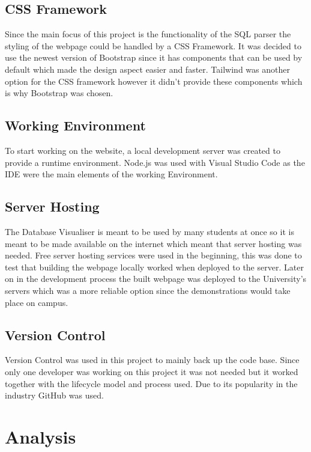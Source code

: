 \subsection{CSS Framework}

Since the main focus of this project is the functionality of the SQL parser the styling of the webpage could be handled by a CSS Framework. It was decided to use the newest version of Bootstrap \cite{Bootstrap} since it has components that can be used by default which made the design aspect easier and faster. Tailwind was another option for the CSS framework however it didn't provide these components which is why Bootstrap was chosen.

\subsection{Working Environment}

To start working on the website, a local development server was created to provide a runtime environment. Node.js was used with Visual Studio Code \cite{Code} as the IDE were the main elements of the working Environment.

\subsection{Server Hosting}

The Database Visualiser is meant to be used by many students at once so it is meant to be made available on the internet which meant that server hosting was needed. Free server hosting services\cite{Infinity} were used in the beginning, this was done to test that building the webpage locally worked when deployed to the server. Later on in the development process the built webpage was deployed to the University's servers which was a more reliable option since the demonstrations would take place on campus.

\subsection{Version Control}

Version Control was used in this project to mainly back up the code base. Since only one developer was working on this project it was not needed but it worked together with the lifecycle model and process used. Due to its popularity in the industry GitHub \cite{Github} was used.

\section{Analysis}



